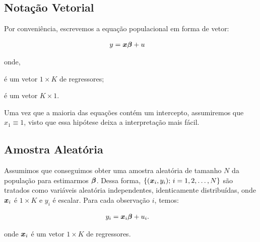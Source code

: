 \documentclass[11pt, oneside, a4paper, article]{article}
\numberwithin{equation}{section}
\begin{document}
\subsection*{Notação Vetorial} 
\noindent
\citet[Sec. 4.2 -- Asymptotic Properties of OLS; p.51]{wool-2010}

Por conveniência, escrevemos a equação populacional em forma de vetor:

\vspace{-1 em}
\begin{align} \label{ols:mod:vec}
	y &= \boldsymbol{x} \boldsymbol{\beta} + u
\end{align}

\noindent
onde,

\vspace{-1 em}
\begin{description}[noitemsep]
	\item [$\xvec \equiv (x_{1}, \dots, x_{K})$] é um vetor $1 \times K$ de regressores;

	\item [$\betavec \equiv (\beta_{1}, \dots, \beta_{K})'$] é um vetor $K \times 1$.
\end{description}

\noindent
Uma vez que a maioria das equações contém um intercepto, assumiremos que $x_{1} \equiv 1$, visto que essa hipótese deixa a interpretação mais fácil.

\subsection*{Amostra Aleatória} 

Assumimos que conseguimos obter uma amostra aleatória de tamanho $N$ da população para estimarmos $\boldsymbol{\beta}$.
Dessa forma, $\{ (\boldsymbol{x}_{i}, y_{i}); \, i = 1, 2, \dots, N \}$
são tratados como variáveis aleatória independentes, identicamente distribuídas, onde
$\boldsymbol{x}_{i}$ é $1 \times K$ e $y_{i}$ é escalar.
Para cada observação $i$, temos:

\vspace{-1 em}
\begin{align} \label{ols:mod:vec:i}
	y_{i} &= \boldsymbol{x}_{i} \boldsymbol{\beta} + u_{i}.
\end{align}

\noindent
onde
$\boldsymbol{x}_{i}$
é um vetor $1 \times K$ de regressores.

\end{document}
